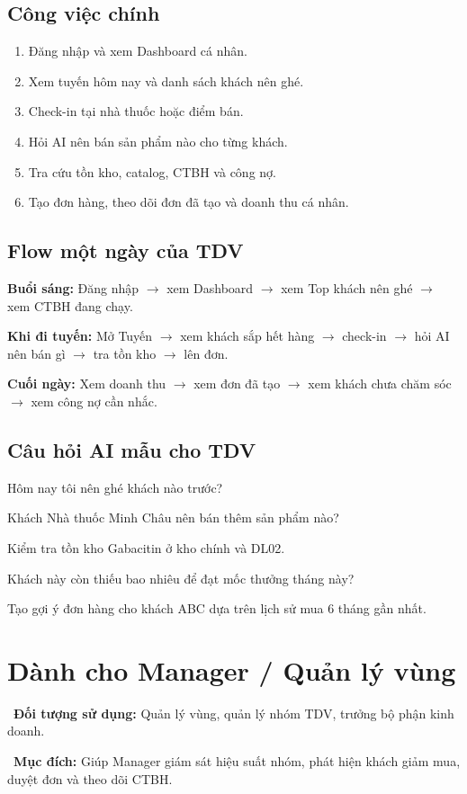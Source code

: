 \documentclass[12pt,a4paper,oneside,openany]{book}
\newcommand{\screenpurpose}[1]{\begin{tcolorbox}[colback=medgreen!8,colframe=medgreen!55,left=6pt,right=6pt,top=4pt,bottom=4pt]\faFlag\ \textbf{Mục đích:} #1\end{tcolorbox}}
\newcommand{\screenuser}[1]{\noindent\faUsers\ \textbf{Đối tượng sử dụng:} #1\par\smallskip}
\newcommand{\prompt}[1]{\begin{tcolorbox}[codeBox]#1\end{tcolorbox}}
\begin{document}
\section{Công việc chính}
\begin{enumerate}
  \item Đăng nhập và xem Dashboard cá nhân.
  \item Xem tuyến hôm nay và danh sách khách nên ghé.
  \item Check-in tại nhà thuốc hoặc điểm bán.
  \item Hỏi AI nên bán sản phẩm nào cho từng khách.
  \item Tra cứu tồn kho, catalog, CTBH và công nợ.
  \item Tạo đơn hàng, theo dõi đơn đã tạo và doanh thu cá nhân.
\end{enumerate}

\section{Flow một ngày của TDV}
\begin{tcolorbox}[roleBox]
\textbf{Buổi sáng:} Đăng nhập $\rightarrow$ xem Dashboard $\rightarrow$ xem Top khách nên ghé $\rightarrow$ xem CTBH đang chạy.

\textbf{Khi đi tuyến:} Mở Tuyến $\rightarrow$ xem khách sắp hết hàng $\rightarrow$ check-in $\rightarrow$ hỏi AI nên bán gì $\rightarrow$ tra tồn kho $\rightarrow$ lên đơn.

\textbf{Cuối ngày:} Xem doanh thu $\rightarrow$ xem đơn đã tạo $\rightarrow$ xem khách chưa chăm sóc $\rightarrow$ xem công nợ cần nhắc.
\end{tcolorbox}

\section{Câu hỏi AI mẫu cho TDV}
\prompt{Hôm nay tôi nên ghé khách nào trước?}
\prompt{Khách Nhà thuốc Minh Châu nên bán thêm sản phẩm nào?}
\prompt{Kiểm tra tồn kho Gabacitin ở kho chính và DL02.}
\prompt{Khách này còn thiếu bao nhiêu để đạt mốc thưởng tháng này?}
\prompt{Tạo gợi ý đơn hàng cho khách ABC dựa trên lịch sử mua 6 tháng gần nhất.}

\chapter{Dành cho Manager / Quản lý vùng}
\screenuser{Quản lý vùng, quản lý nhóm TDV, trưởng bộ phận kinh doanh.}
\screenpurpose{Giúp Manager giám sát hiệu suất nhóm, phát hiện khách giảm mua, duyệt đơn và theo dõi CTBH.}
\end{document}

